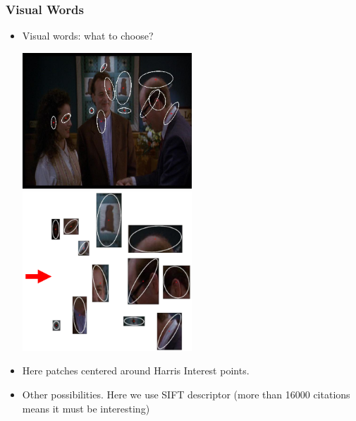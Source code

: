 \documentclass[10pt]{beamer}
\begin{document}
\begin{frame}
  \frametitle{Visual Words}

  \begin{itemize}
  \item Visual words: what to choose?
    \begin{center}
      \includegraphics[width=0.5\textwidth]{FIGURES/groundhogday}~~
      \includegraphics[width=0.5\textwidth]{FIGURES/gdwords}
    \end{center}
  \item Here patches centered around Harris Interest points.
  \item Other possibilities. Here we use SIFT descriptor (more than
    16000 citations means it must be interesting)
  \end{itemize}
\end{frame}
\end{document}

